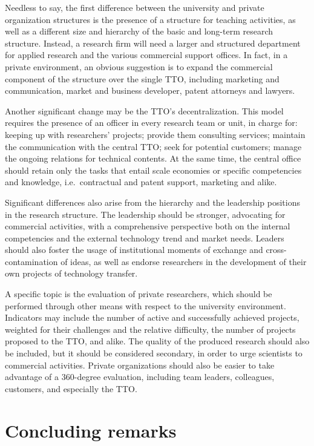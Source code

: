 Needless to say, the first difference between the university and private organization structures is the presence of a structure for teaching activities, as well as a different size and hierarchy of the basic and long-term research structure. Instead, a research firm will need a larger and structured department for applied research and the various commercial support offices. In fact, in a private environment, an obvious suggestion is to expand the commercial component of the structure over the single TTO, including marketing and communication, market and business developer, patent attorneys and lawyers.

Another significant change may be the TTO's decentralization. This model requires the presence of an officer in every research team or unit, in charge for: keeping up with researchers' projects; provide them consulting services; maintain the communication with the central TTO; seek for potential customers; manage the ongoing relations for technical contents. At the same time, the central office should retain only the tasks that entail scale economies or specific competencies and knowledge, i.e.\ contractual and patent support, marketing and alike.

Significant differences also arise from the hierarchy and the leadership positions in the research structure. The leadership should be stronger, advocating for commercial activities, with a comprehensive perspective both on the internal competencies and the external technology trend and market needs. Leaders should also foster the usage of institutional moments of exchange and cross-contamination of ideas, as well as endorse researchers in the development of their own projects of technology transfer.

A specific topic is the evaluation of private researchers, which should be performed through other means with respect to the university environment. Indicators may include the number of active and successfully achieved projects, weighted for their challenges and the relative difficulty, the number of projects proposed to the TTO, and alike. The quality of the produced research should also be included, but it should be considered secondary, in order to urge scientists to commercial activities. Private organizations should also be easier to take advantage of a 360-degree evaluation, including team leaders, colleagues, customers, and especially the TTO. 

\section{Concluding remarks}

